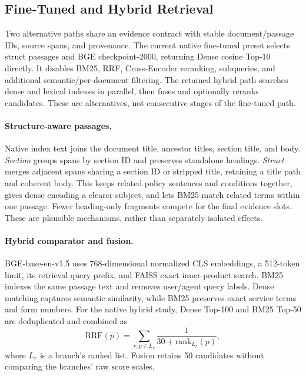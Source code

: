 \subsection{Fine-Tuned and Hybrid Retrieval}
\label{sec:retrieval-method}
Two alternative paths share an evidence contract with stable document/passage IDs, source spans, and provenance. The current native fine-tuned preset selects struct passages and BGE checkpoint-2000, returning Dense cosine Top-10 directly. It disables BM25, RRF, Cross-Encoder reranking, subqueries, and additional semantic/per-document filtering. The retained hybrid path searches dense and lexical indexes in parallel, then fuses and optionally reranks candidates. These are alternatives, not consecutive stages of the fine-tuned path.

\paragraph{Structure-aware passages.}
Native index text joins the document title, ancestor titles, section title, and body. \emph{Section} groups spans by section ID and preserves standalone headings. \emph{Struct} merges adjacent spans sharing a section ID or stripped title, retaining a title path and coherent body. This keeps related policy sentences and conditions together, gives dense encoding a clearer subject, and lets BM25 match related terms within one passage. Fewer heading-only fragments compete for the final evidence slots. These are plausible mechanisms, rather than separately isolated effects.

\paragraph{Hybrid comparator and fusion.}
BGE-base-en-v1.5 uses 768-dimensional normalized CLS embeddings, a 512-token limit, its retrieval query prefix, and FAISS exact inner-product search. BM25 indexes the same passage text and removes user/agent query labels. Dense matching captures semantic similarity, while BM25 preserves exact service terms and form numbers. For the native hybrid study, Dense Top-100 and BM25 Top-50 are deduplicated and combined as
\begin{equation}
 \mathrm{RRF}(p)=\sum_{r:p\in L_r}
 \frac{1}{30+\mathrm{rank}_{L_r}(p)},
\end{equation}
where $L_r$ is a branch's ranked list. Fusion retains 50 candidates without comparing the branches' raw score scales.

